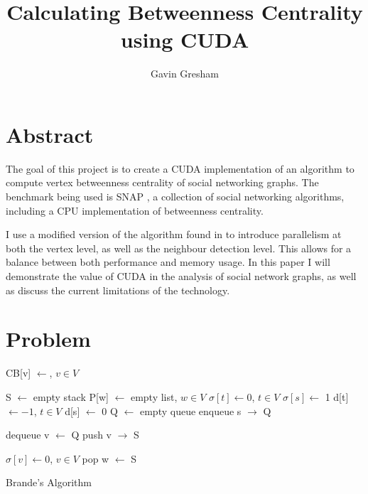 \documentclass[10pt,twocolumn]{article}
\begin{document}
\title{Calculating Betweenness Centrality using CUDA}
\author{Gavin Gresham}
\maketitle

\section{Abstract}
The goal of this project is to create a CUDA \cite{cudaGuide} implementation of an algorithm to compute vertex betweenness centrality of social networking graphs. The benchmark being used is SNAP \cite{snapGraph}, a collection of social networking algorithms, including a CPU implementation of betweenness centrality. 
 
I use a modified version of the algorithm found in \cite{Brandes01afaster} to introduce parallelism at both the vertex level, as well as the neighbour detection level. This allows for a balance between both performance and memory usage. In this paper I will demonstrate the value of CUDA in the analysis of social network graphs, as well as discuss the current limitations of the technology.

\section{Problem}

\begin{algorithm}[HA]
CB[v] $\leftarrow$, $v \in V$\;
{
	S $\leftarrow$ empty stack\;
	P[w] $\leftarrow$ empty list, $w \in V$\;
	$\sigma [t] \leftarrow 0$, $t \in V$\; $\sigma [s] \leftarrow$ 1\;
	d[t] $\leftarrow - 1$, $t \in V$\; d[s] $\leftarrow$ 0\;
	Q $\leftarrow$ empty queue\;
	enqueue s $\rightarrow$ Q\;
	{
		dequeue v $\leftarrow$ Q\;
		push v $\rightarrow$ S\;
		{
			
		}	
	}


	$\sigma[v] \leftarrow 0$, $v \in V$\;
	{
		pop w $\leftarrow$ S\;
	}
}

\caption{Brande's Algorithm}

\end{algorithm}
 
\end{document}
